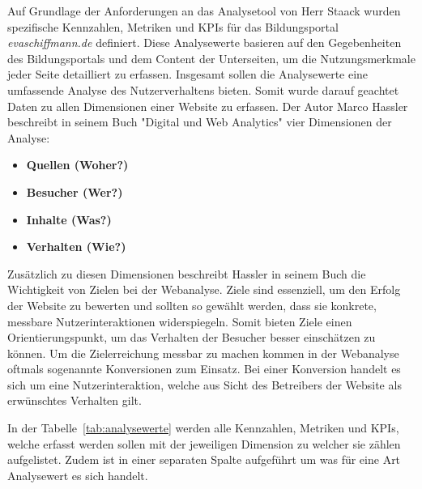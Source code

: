 Auf Grundlage der Anforderungen an das Analysetool von Herr Staack wurden spezifische Kennzahlen, Metriken und KPIs für das Bildungsportal \textit{evaschiffmann.de} definiert. Diese Analysewerte basieren auf den Gegebenheiten des Bildungsportals und dem Content der Unterseiten, um die Nutzungsmerkmale jeder Seite detailliert zu erfassen. Insgesamt sollen die Analysewerte eine umfassende Analyse des Nutzerverhaltens bieten. Somit wurde darauf geachtet Daten zu allen Dimensionen einer Website zu erfassen. Der Autor Marco Hassler beschreibt in seinem Buch "Digital und Web Analytics" vier Dimensionen der Analyse: 

\begin{itemize}
    \item \textbf{Quellen (Woher?)}  
    \item \textbf{Besucher (Wer?)}  
    \item \textbf{Inhalte (Was?)}  
    \item \textbf{Verhalten (Wie?)}  
\end{itemize}

Zusätzlich zu diesen Dimensionen beschreibt Hassler in seinem Buch die Wichtigkeit von Zielen bei der Webanalyse. Ziele sind essenziell, um den Erfolg der Website zu bewerten und sollten so gewählt werden, dass sie konkrete, messbare Nutzerinteraktionen widerspiegeln. Somit bieten Ziele einen Orientierungspunkt, um das Verhalten der Besucher besser einschätzen zu können. Um die Zielerreichung messbar zu machen kommen in der Webanalyse oftmals sogenannte Konversionen zum Einsatz. Bei einer Konversion handelt es sich um eine Nutzerinteraktion, welche aus Sicht des Betreibers der Website als erwünschtes Verhalten gilt. 

In der Tabelle~\ref{tab:analysewerte} werden alle Kennzahlen, Metriken und KPIs, welche erfasst werden sollen mit der jeweiligen Dimension zu welcher sie zählen aufgelistet. Zudem ist in einer separaten Spalte aufgeführt um was für eine Art Analysewert es sich handelt.


